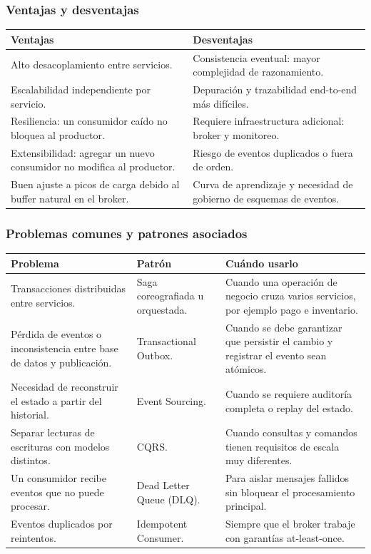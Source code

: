 \documentclass[12pt,a4paper]{article}
\begin{document}
\subsubsection{Ventajas y desventajas}

\begin{longtable}{P{0.45\textwidth} P{0.45\textwidth}}
\toprule
\textbf{Ventajas} & \textbf{Desventajas} \\
\midrule
Alto desacoplamiento entre servicios. & Consistencia eventual: mayor complejidad de razonamiento. \\
Escalabilidad independiente por servicio. & Depuración y trazabilidad end-to-end más difíciles. \\
Resiliencia: un consumidor caído no bloquea al productor. & Requiere infraestructura adicional: broker y monitoreo. \\
Extensibilidad: agregar un nuevo consumidor no modifica al productor. & Riesgo de eventos duplicados o fuera de orden. \\
Buen ajuste a picos de carga debido al buffer natural en el broker. & Curva de aprendizaje y necesidad de gobierno de esquemas de eventos. \\
\bottomrule
\end{longtable}

\subsubsection{Problemas comunes y patrones asociados}

\begin{longtable}{P{0.30\textwidth} P{0.25\textwidth} P{0.35\textwidth}}
\toprule
\textbf{Problema} & \textbf{Patrón} & \textbf{Cuándo usarlo} \\
\midrule
Transacciones distribuidas entre servicios. & Saga coreografiada u orquestada. & Cuando una operación de negocio cruza varios servicios, por ejemplo pago e inventario. \\
Pérdida de eventos o inconsistencia entre base de datos y publicación. & Transactional Outbox. & Cuando se debe garantizar que persistir el cambio y registrar el evento sean atómicos. \\
Necesidad de reconstruir el estado a partir del historial. & Event Sourcing. & Cuando se requiere auditoría completa o replay del estado. \\
Separar lecturas de escrituras con modelos distintos. & CQRS. & Cuando consultas y comandos tienen requisitos de escala muy diferentes. \\
Un consumidor recibe eventos que no puede procesar. & Dead Letter Queue (DLQ). & Para aislar mensajes fallidos sin bloquear el procesamiento principal. \\
Eventos duplicados por reintentos. & Idempotent Consumer. & Siempre que el broker trabaje con garantías at-least-once. \\
\bottomrule
\end{longtable}
\end{document}
